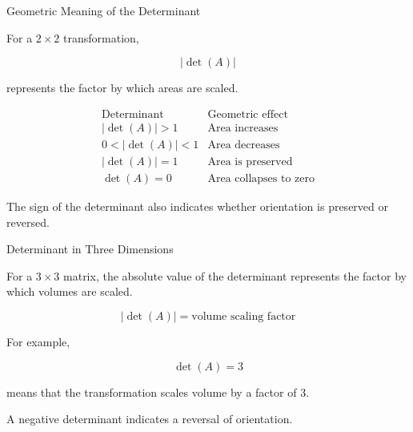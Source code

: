 
\begin{frame}{Geometric Meaning of the Determinant}

For a $2\times2$ transformation,

\[
|\det(A)|
\]

represents the factor by which areas are scaled.

\vspace{0.4cm}

\[
\begin{array}{c|c}
\text{Determinant} & \text{Geometric effect}\\
\hline
|\det(A)|>1 & \text{Area increases}\\[3pt]
0<|\det(A)|<1 & \text{Area decreases}\\[3pt]
|\det(A)|=1 & \text{Area is preserved}\\[3pt]
\det(A)=0 & \text{Area collapses to zero}
\end{array}
\]

\vspace{0.3cm}

The sign of the determinant also indicates whether
orientation is preserved or reversed.

\end{frame}



\begin{frame}{Determinant in Three Dimensions}

For a $3\times3$ matrix, the absolute value of the determinant
represents the factor by which volumes are scaled.

\[
\boxed{
|\det(A)|
=
\text{volume scaling factor}
}
\]

\vspace{0.4cm}

For example,

\[
\det(A)=3
\]

means that the transformation scales volume by a factor of $3$.

\vspace{0.4cm}

A negative determinant indicates a reversal of orientation.

\end{frame}


